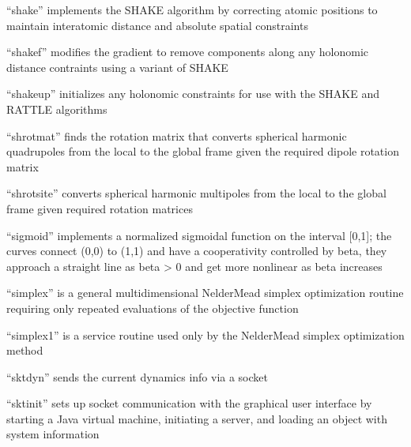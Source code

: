 \documentclass[letterpaper,11pt,english]{sphinxmanual}
\begin{document}



“shake” implements the SHAKE algorithm by correcting atomic
positions to maintain interatomic distance and absolute spatial
constraints


“shakef” modifies the gradient to remove components along any
holonomic distance contraints using a variant of SHAKE


“shakeup” initializes any holonomic constraints for use with
the SHAKE and RATTLE algorithms


“shrotmat” finds the rotation matrix that converts spherical
harmonic quadrupoles from the local to the global frame given
the required dipole rotation matrix


“shrotsite” converts spherical harmonic multipoles from the
local to the global frame given required rotation matrices


“sigmoid” implements a normalized sigmoidal function on the
interval {[}0,1{]}; the curves connect (0,0) to (1,1) and have
a cooperativity controlled by beta, they approach a straight
line as beta \sphinxhyphen{}\textgreater{} 0 and get more nonlinear as beta increases


“simplex” is a general multidimensional Nelder\sphinxhyphen{}Mead simplex
optimization routine requiring only repeated evaluations of
the objective function


“simplex1” is a service routine used only by the Nelder\sphinxhyphen{}Mead
simplex optimization method


“sktdyn” sends the current dynamics info via a socket


“sktinit” sets up socket communication with the graphical
user interface by starting a Java virtual machine, initiating
a server, and loading an object with system information
\end{document}
